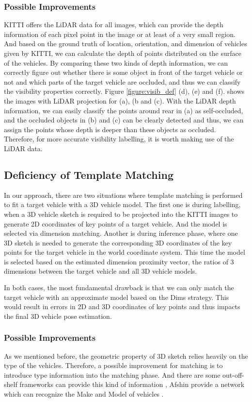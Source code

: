 \documentclass[a4paper,12pt]{article}
\begin{document}
\subsubsection{Possible Improvements}

KITTI offers the LiDAR data for all images, which can provide the depth information of each pixel point in the image or at least of a very small region. And based on the ground truth of location, orientation, and dimension of vehicles given by KITTI, we can calculate the depth of points distributed on the surface of the vehicles. By comparing these two kinds of depth information, we can correctly figure out whether there is some object in front of the target vehicle or not and which parts of the target vehicle are occluded, and thus we can classify the visibility properties correctly. Figure \ref{figure:visib_def} (d), (e) and (f). shows the images with LiDAR projection for (a), (b and (c). With the LiDAR depth information, we can easily classify the points around rear in (a) as self-occluded, and the occluded objects in (b) and (c) can be clearly detected and thus, we can assign the points whose depth is deeper than these objects as occluded. Therefore, for more accurate visibility labelling, it is worth making use of the LiDAR data.

\subsection{Deficiency of Template Matching}
In our approach, there are two situations where template matching is performed to fit a target vehicle with a 3D vehicle model. The first one is during labelling, when a 3D vehicle sketch is required to be projected into the KITTI images to generate 2D coordinates of key points of a target vehicle. And the model is selected via dimension matching. Another is during inference phase, where one 3D sketch is needed to generate the corresponding 3D coordinates of the key points for the target vehicle in the world coordinate system. This time the model is selected based on the estimated dimension proximity vector, \ie the ratios of 3 dimensions between the target vehicle and all 3D vehicle models.

In both cases, the most fundamental drawback is that we can only match the target vehicle with an approximate model based on the Dims strategy. This would result in errors in 2D and 3D coordinates of key points and thus impacts the final 3D vehicle pose estimation.

\subsubsection{Possible Improvements}
As we mentioned before, the geometric property of 3D sketch relies heavily on the type of the vehicles. Therefore, a possible improvement for matching is to introduce type information into the matching phase. And there are some out-off-shelf frameworks can provide this kind of information \cite{DBLP:journals/corr/YangLLT15, 7780697, 7410527, DBLP:journals/corr/DehghanMSO17}, \ie Afshin \etal provide a network which can recognize the Make and Model of vehicles \cite{DBLP:journals/corr/DehghanMSO17}. 
\end{document}
